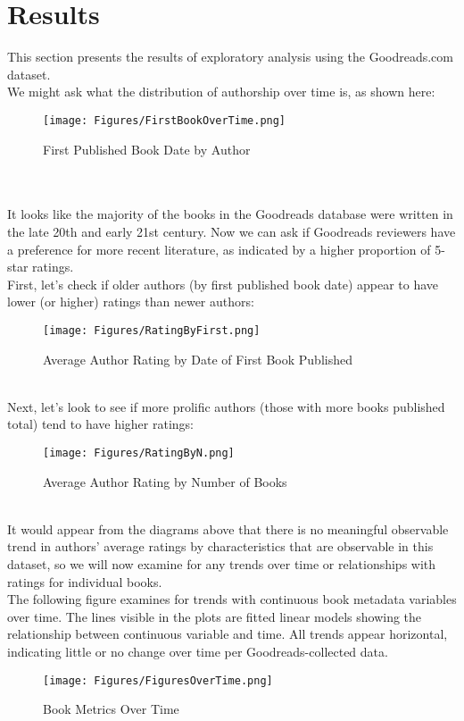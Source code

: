 \documentclass{article}
\begin{document}
\section{Results}
This section presents the results of exploratory analysis using the Goodreads.com dataset.
\\
We might ask what the distribution of authorship over time is, as shown here:
\\
\begin{figure}[!htbp]
	\centering
	\texttt{[image: Figures/FirstBookOverTime.png]}
	\caption{First Published Book Date by Author}
\end{figure}\\
\\It looks like the majority of the books in the Goodreads database were written in the late 20th and early 21st century.
Now we can ask if Goodreads reviewers have a preference for more recent literature, as indicated by a higher proportion of 5-star ratings.
\\First, let's check if older authors (by first published book date) appear to have lower (or higher) ratings than newer authors:
\begin{figure}[!htbp]
	\centering
	\texttt{[image: Figures/RatingByFirst.png]}
	\caption{Average Author Rating by Date of First Book Published}
\end{figure}\\
Next, let's look to see if more prolific authors (those with more books published total) tend to have higher ratings:\\
\begin{figure}[!htbp]
	\centering
	\texttt{[image: Figures/RatingByN.png]}
	\caption{Average Author Rating by Number of Books}
\end{figure}\\
It would appear from the diagrams above that there is no meaningful observable trend in authors' average ratings by characteristics that are observable in this dataset, so we will now examine for any trends over time or relationships with ratings for individual books.
\\ The following figure examines for trends with continuous book metadata variables over time. The lines visible in the plots are fitted linear models showing the relationship between continuous variable and time. All trends appear horizontal, indicating little or no change over time per Goodreads-collected data.\\
\begin{figure}[!htbp]
	\centering
	\texttt{[image: Figures/FiguresOverTime.png]}
	\caption{Book Metrics Over Time}
\end{figure}\\
\end{document}
